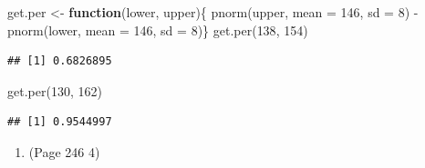 \documentclass{article}
\newenvironment{Shaded}{\begin{snugshade}}{\end{snugshade}}
\newcommand{\AttributeTok}[1]{\textcolor[rgb]{0.77,0.63,0.00}{#1}}
\newcommand{\ControlFlowTok}[1]{\textcolor[rgb]{0.13,0.29,0.53}{\textbf{#1}}}
\newcommand{\DecValTok}[1]{\textcolor[rgb]{0.00,0.00,0.81}{#1}}
\newcommand{\FunctionTok}[1]{\textcolor[rgb]{0.00,0.00,0.00}{#1}}
\newcommand{\NormalTok}[1]{#1}
\newcommand{\OtherTok}[1]{\textcolor[rgb]{0.56,0.35,0.01}{#1}}
\newcommand{\SpecialCharTok}[1]{\textcolor[rgb]{0.00,0.00,0.00}{#1}}
\begin{document}
\begin{Shaded}
\begin{Highlighting}[]
\NormalTok{get.per }\OtherTok{\textless{}{-}} \ControlFlowTok{function}\NormalTok{(lower, upper)\{}
  \FunctionTok{pnorm}\NormalTok{(upper, }\AttributeTok{mean =} \DecValTok{146}\NormalTok{, }\AttributeTok{sd =} \DecValTok{8}\NormalTok{) }\SpecialCharTok{{-}} \FunctionTok{pnorm}\NormalTok{(lower, }\AttributeTok{mean =} \DecValTok{146}\NormalTok{, }\AttributeTok{sd =} \DecValTok{8}\NormalTok{)\}}
\FunctionTok{get.per}\NormalTok{(}\DecValTok{138}\NormalTok{, }\DecValTok{154}\NormalTok{)}
\end{Highlighting}
\end{Shaded}

\begin{verbatim}
## [1] 0.6826895
\end{verbatim}

\begin{Shaded}
\begin{Highlighting}[]
\FunctionTok{get.per}\NormalTok{(}\DecValTok{130}\NormalTok{, }\DecValTok{162}\NormalTok{)}
\end{Highlighting}
\end{Shaded}

\begin{verbatim}
## [1] 0.9544997
\end{verbatim}

\begin{enumerate}
\def\labelenumi{\arabic{enumi}.}
\setcounter{enumi}{1}
\tightlist
\item
  (Page 246 4)
\end{enumerate}
\end{document}
